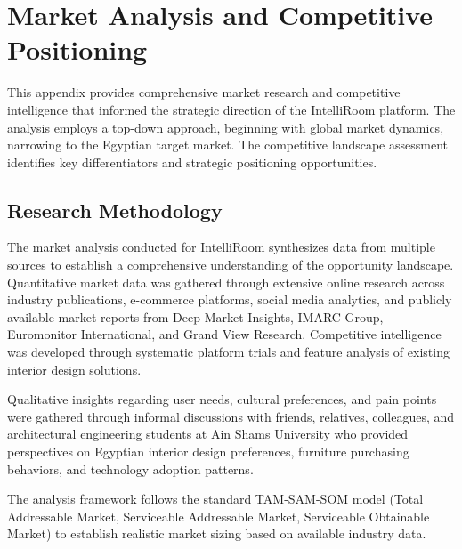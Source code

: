 
\chapter{Market Analysis and Competitive Positioning}
\label{app:market_analysis}

This appendix provides comprehensive market research and competitive intelligence that informed the strategic direction of the IntelliRoom platform. The analysis employs a top-down approach, beginning with global market dynamics, narrowing to the Egyptian target market. The competitive landscape assessment identifies key differentiators and strategic positioning opportunities.

\section{Research Methodology}
\label{sec:app_methodology}

The market analysis conducted for IntelliRoom synthesizes data from multiple sources to establish a comprehensive understanding of the opportunity landscape. Quantitative market data was gathered through extensive online research across industry publications, e-commerce platforms, social media analytics, and publicly available market reports from Deep Market Insights, IMARC Group, Euromonitor International, and Grand View Research. Competitive intelligence was developed through systematic platform trials and feature analysis of existing interior design solutions.

Qualitative insights regarding user needs, cultural preferences, and pain points were gathered through informal discussions with friends, relatives, colleagues, and architectural engineering students at Ain Shams University who provided perspectives on Egyptian interior design preferences, furniture purchasing behaviors, and technology adoption patterns.

The analysis framework follows the standard TAM-SAM-SOM model (Total Addressable Market, Serviceable Addressable Market, Serviceable Obtainable Market) to establish realistic market sizing based on available industry data.

